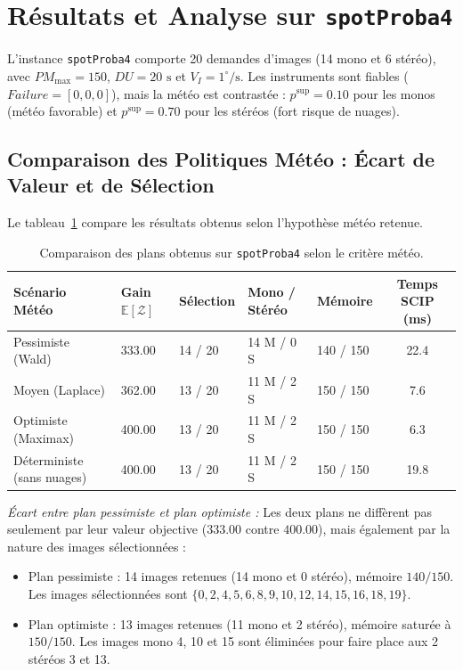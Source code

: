 \section{Résultats et Analyse sur \texttt{spotProba4}}

L'instance \texttt{spotProba4} comporte 20 demandes d'images (14 mono et 6 stéréo), avec $PM_{\max} = 150$, $DU = 20\text{ s}$ et $V_I = 1^\circ/\text{s}$. Les instruments sont fiables ($Failure = [0, 0, 0]$), mais la météo est contrastée : $p^{\sup} = 0.10$ pour les monos (météo favorable) et $p^{\sup} = 0.70$ pour les stéréos (fort risque de nuages).

\subsection{Comparaison des Politiques Météo : Écart de Valeur et de Sélection}
Le tableau~\ref{tab:spot4_comparaison} compare les résultats obtenus selon l'hypothèse météo retenue.

\begin{table}[H]
\centering
\small
\begin{tabularx}{\textwidth}{lXXXXc}
\toprule
\textbf{Scénario Météo} & \textbf{Gain $\mathbb{E}[\mathcal{Z}]$} & \textbf{Sélection} & \textbf{Mono / Stéréo} & \textbf{Mémoire} & \textbf{Temps SCIP (ms)} \\
\midrule
Pessimiste (Wald) & 333.00 & 14 / 20 & 14 M / 0 S & 140 / 150 & 22.4 \\
Moyen (Laplace) & 362.00 & 13 / 20 & 11 M / 2 S & 150 / 150 & 7.6 \\
Optimiste (Maximax) & 400.00 & 13 / 20 & 11 M / 2 S & 150 / 150 & 6.3 \\
Déterministe (sans nuages) & 400.00 & 13 / 20 & 11 M / 2 S & 150 / 150 & 19.8 \\
\bottomrule
\end{tabularx}
\caption{Comparaison des plans obtenus sur \texttt{spotProba4} selon le critère météo.}
\label{tab:spot4_comparaison}
\end{table}

\noindent\textit{Écart entre plan pessimiste et plan optimiste :} Les deux plans ne diffèrent pas seulement par leur valeur objective ($333.00$ contre $400.00$), mais également par la nature des images sélectionnées :
\begin{itemize}
    \item Plan pessimiste : 14 images retenues (14 mono et 0 stéréo), mémoire $140 / 150$. Les images sélectionnées sont $\{0, 2, 4, 5, 6, 8, 9, 10, 12, 14, 15, 16, 18, 19\}$.
    \item Plan optimiste : 13 images retenues (11 mono et 2 stéréo), mémoire saturée à $150 / 150$. Les images mono 4, 10 et 15 sont éliminées pour faire place aux 2 stéréos 3 et 13.
\end{itemize}

